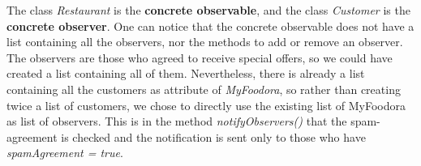 The class \textit{Restaurant} is the \textbf{concrete observable}, and the class \textit{Customer} is the \textbf{concrete observer}. One can notice that the concrete observable does not have a list containing all the observers, nor the methods to add or remove an observer. The observers are those who agreed to receive special offers, so we could have created a list containing all of them. Nevertheless, there is already a list containing all the customers as attribute of \textit{MyFoodora}, so rather than creating twice a list of customers, we chose to directly use the existing list of MyFoodora as list of observers. This is in the method \textit{notifyObservers()} that the spam-agreement is checked and the notification is sent only to those who have \textit{spamAgreement = true}.


